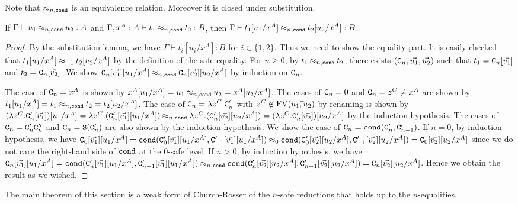 Note that $\mathbin{\approx_{n,{\tt cond}}}$ is an equivalence relation. Moreover it is closed under substitution. 
\begin{lemma}\label{lem:nequal_subst}
  If $\Gamma \vdash u_1 \mathbin{\approx_{n,{\tt cond}}} u_2:A$ and $\Gamma, x^A:A \vdash t_1 \mathbin{\approx_{n,{\tt cond}}} t_2:B$, then
  $\Gamma \vdash t_1[u_1/x^A] \mathbin{\approx_{n,{\tt cond}}} t_2[u_2/x^A] :B$. 
\end{lemma}
\begin{proof}
  By the substitution lemma, we have $\Gamma \vdash t_i[u_i/x^A]: B$ for $i\in\{1,2\}$.
  Thus we need to show the equality part. 
  It is easily checked that $t_1[u_1/x^A] \mathbin{\approx_{-1}} t_2[u_2/x^A]$ by the definition of the safe equality.
  For $n\ge 0$, by $t_1\mathbin{\approx_{n,{\tt cond}}} t_2$, there exists $({\tt C}_{n},\vec{u_1},\vec{u_2})$ such that
  $t_1 = {\tt C}_{n}[\vec{v_1}]$ and $t_2 = {\tt C}_{n}[\vec{v_2}]$.
  We show ${\tt C}_{n}[\vec{v_1}][u_1/x^A] \mathbin{\approx_{n,{\tt cond}}} {\tt C}_{n}[\vec{v_2}][u_2/x^A]$ by induction on ${\tt C}_{n}$. 

  The case of ${\tt C}_{n}=x^A$ is shown by $x^A[u_1/x^A] = u_1 \mathbin{\approx_{n,{\tt cond}}} u_2 = x^A[u_2/x^A]$.
  The cases of ${\tt C}_{n}=0$ and ${\tt C}_{n}=z^C \neq x^A$
  are shown by $t_1[u_1/x^A] = t_1 \mathbin{\approx_{n,{\tt cond}}} t_2 = t_2[u_2/x^A]$.
  The case of ${\tt C}_{n}=\lambda z^C.{\tt C}_{n}'$ with $z^C\not\in{{\rm FV}}(\vec{u_1,u_2})$ by renaming
  is shown by
  $(\lambda z^C.{\tt C}_{n}'[\vec{v_1}])[u_1/x^A] = \lambda z^C.({\tt C}_{n}'[\vec{v_1}][u_1/x^A]) \mathbin{\approx_{n,{\tt cond}}} \lambda z^C.({\tt C}_{n}'[\vec{v_2}][u_2/x^A]) = (\lambda z^C.{\tt C}_{n}'[\vec{v_2}])[u_2/x^A]$ by the induction hypothesis.
  The cases of ${\tt C}_{n}={\tt C}_{n}'{\tt C}_{n}''$ and ${\tt C}_{n}={\tt S}({\tt C}_{n}')$
  are also shown by the induction hypothesis.
  We show the case of ${\tt C}_{n}={\tt cond}({\tt C}_{n}',{\tt C}_{n-1}')$.
  If $n=0$, by induction hypothesis, we have ${\tt C}_{0}[\vec{v_1}][u_1/x^A] = {\tt cond}({\tt C}_{0}'[\vec{v_1}][u_1/x^A],{\tt C}_{-1}'[\vec{v_1}][u_1/x^A]) \mathbin{\approx_{0}} {\tt cond}({\tt C}_{0}'[\vec{v_2}][u_2/x^A],{\tt C}_{-1}'[\vec{v_2}][u_2/x^A]) = {\tt C}_{0}[\vec{v_2}][u_2/x^A]$ since we do not care the right-hand side of ${\tt cond}$ at the $0$-safe level. 
  If $n>0$, by induction hypothesis, we have ${\tt C}_{n}[\vec{v_1}][u_1/x^A] = {\tt cond}({\tt C}_{n}'[\vec{v_1}][u_1/x^A],{\tt C}_{n-1}'[\vec{v_1}][u_1/x^A]) \mathbin{\approx_{n,{\tt cond}}} {\tt cond}({\tt C}_{n}'[\vec{v_2}][u_2/x^A],{\tt C}_{n-1}'[\vec{v_2}][u_2/x^A]) = {\tt C}_{n}[\vec{v_2}][u_2/x^A]$.
  Hence we obtain the result as we wished. 
\end{proof}


The main theorem of this section is a weak form of Church-Rosser
of the $n$-safe reductions that holds up to the $n$-equalities. 

